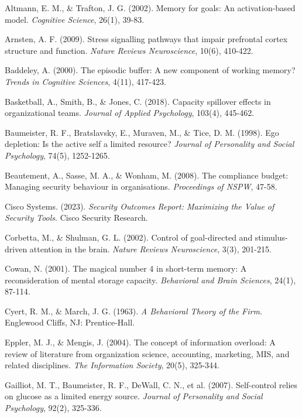 \documentclass[11pt,a4paper]{article}
\begin{document}
\begin{thebibliography}{99}

Altmann, E. M., \& Trafton, J. G. (2002). Memory for goals: An activation-based model. \textit{Cognitive Science}, 26(1), 39-83.

Arnsten, A. F. (2009). Stress signalling pathways that impair prefrontal cortex structure and function. \textit{Nature Reviews Neuroscience}, 10(6), 410-422.

Baddeley, A. (2000). The episodic buffer: A new component of working memory? \textit{Trends in Cognitive Sciences}, 4(11), 417-423.

Basketball, A., Smith, B., \& Jones, C. (2018). Capacity spillover effects in organizational teams. \textit{Journal of Applied Psychology}, 103(4), 445-462.

Baumeister, R. F., Bratslavsky, E., Muraven, M., \& Tice, D. M. (1998). Ego depletion: Is the active self a limited resource? \textit{Journal of Personality and Social Psychology}, 74(5), 1252-1265.

Beautement, A., Sasse, M. A., \& Wonham, M. (2008). The compliance budget: Managing security behaviour in organisations. \textit{Proceedings of NSPW}, 47-58.

Cisco Systems. (2023). \textit{Security Outcomes Report: Maximizing the Value of Security Tools}. Cisco Security Research.

Corbetta, M., \& Shulman, G. L. (2002). Control of goal-directed and stimulus-driven attention in the brain. \textit{Nature Reviews Neuroscience}, 3(3), 201-215.

Cowan, N. (2001). The magical number 4 in short-term memory: A reconsideration of mental storage capacity. \textit{Behavioral and Brain Sciences}, 24(1), 87-114.

Cyert, R. M., \& March, J. G. (1963). \textit{A Behavioral Theory of the Firm}. Englewood Cliffs, NJ: Prentice-Hall.

Eppler, M. J., \& Mengis, J. (2004). The concept of information overload: A review of literature from organization science, accounting, marketing, MIS, and related disciplines. \textit{The Information Society}, 20(5), 325-344.

Gailliot, M. T., Baumeister, R. F., DeWall, C. N., et al. (2007). Self-control relies on glucose as a limited energy source. \textit{Journal of Personality and Social Psychology}, 92(2), 325-336.


\end{thebibliography}
\end{document}
